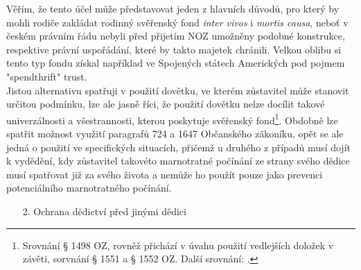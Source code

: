 \documentclass{article}
\begin{document}
 Věřím, že tento účel může představovat jeden z hlavních důvodů, pro který by mohli rodiče zakládat rodinný svěřenský fond \textit{inter vivos} i \textit{mortis causa}, neboť v českém právním řádu nebyli před přijetím NOZ umožněny podobné konstrukce, respektive právní uspořádání, které by takto majetek chránili. Velkou oblibu si tento typ fondu získal například ve Spojených státech Amerických pod pojmem "spendthrift" trust.\\
 
 Jistou alternativu spatřuji v použití dovětku, ve kterém zůstavitel může stanovit určitou podmínku, lze ale jasně říci, že použití dovětku nelze docílit takové univerzálnosti a všestrannosti, kterou poskytuje svěřenský fond\footnote{Srovnání § 1498 OZ, rovněž přichází v úvahu použití vedlejších doložek v závěti, sorvnání § 1551 a § 1552 OZ. Další srovnání: .}. Obdobně lze spatřit možnost využití paragrafů 724 a 1647 Občanského zákoníku, opět se ale jedná o použití ve specifických situacích, přičemž u druhého z případů musí dojít k vydědění, kdy zůstavitel takovéto marnotratné počínání ze strany svého dědice musí spatřovat již za svého života a nemůže ho použít pouze jako prevenci potenciálního marnotratného počínání.\\
 
 \begin{enumerate}
 \item[2.] Ochrana dědictví před jinými dědici
 \end{enumerate}
 
\end{document}
